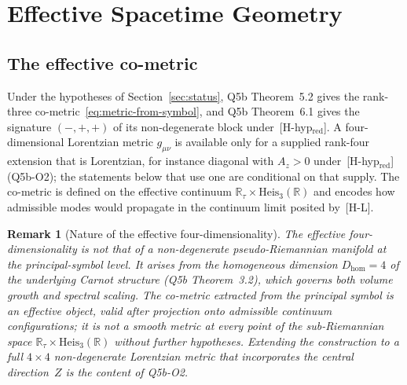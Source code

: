 \documentclass[11pt,a4paper]{article}
\newtheorem{remark}[theorem]{Remark}
\begin{document}
  \section{Effective Spacetime Geometry}
  \label{sec:geometry}

  \subsection{The effective co-metric}
    \label{sec:metric}

    Under the hypotheses of Section~\ref{sec:status}, Q5b Theorem~5.2 gives the rank-three
    co-metric~\eqref{eq:metric-from-symbol}, and Q5b Theorem~6.1 gives the signature $(-,+,+)$ of its non-degenerate
    block under~[H-hyp$_{\mathrm{red}}$].
    A four-dimensional Lorentzian metric $g_{\mu\nu}$ is available only for a supplied rank-four extension that is
    Lorentzian, for instance diagonal with $A_z > 0$ under~[H-hyp$_{\mathrm{red}}$] (Q5b-O2);
    the statements below that use one are conditional on that supply.
    The co-metric is defined on the effective continuum $\mathbb{R}_\tau \times \mathrm{Heis}_3(\mathbb{R})$ and
    encodes how admissible modes would propagate in the continuum limit posited by~[H-L].

    \begin{remark}[Nature of the effective four-dimensionality]
      \label{rem:4d}
      \setlength{\emergencystretch}{1em}
      The effective four-dimensionality is not that of a non-degenerate pseudo-Riemannian manifold at the
      principal-symbol level.
      It arises from the homogeneous dimension $D_{\mathrm{hom}} = 4$ of the underlying Carnot structure (Q5b
      Theorem~3.2), which governs both volume growth and spectral scaling.
      The co-metric extracted from the principal symbol is an effective object, valid after projection onto
      admissible continuum configurations; it is not a smooth metric at every point of the sub-Riemannian space
      $\mathbb{R}_\tau \times \mathrm{Heis}_3(\mathbb{R})$ without further hypotheses.
      Extending the construction to a full $4\times 4$ non-degenerate Lorentzian metric that incorporates the
      central direction~$Z$ is the content of Q5b-O2.
    \end{remark}
\end{document}
